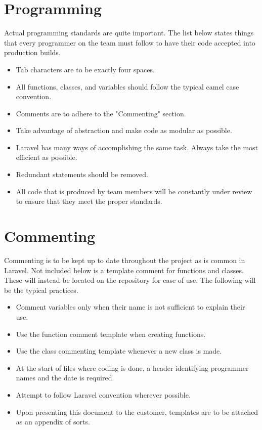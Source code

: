 \documentclass[]{article}
\begin{document}
\section{Programming}
Actual programming standards are quite important. The list below states things that every programmer on the team must follow to have their code accepted into production builds.
\begin{itemize}
	\item Tab characters are to be exactly four spaces.
	\item All functions, classes, and variables should follow the typical camel case convention.
	\item Comments are to adhere to the "Commenting" section.
	\item Take advantage of abstraction and make code as modular as possible.
	\item Laravel has many ways of accomplishing the same task. Always take the most efficient as possible.
	\item Redundant statements should be removed.
	\item All code that is produced by team members will be constantly under review to ensure that they meet the proper standards.
\end{itemize}

\section{Commenting}
Commenting is to be kept up to date throughout the project as is common in Laravel. Not included below is a template comment for functions and classes. These will instead be located on the repository for ease of use. The following will be the typical practices.
\begin{itemize}
	\item Comment variables only when their name is not sufficient to explain their use.
	\item Use the function comment template when creating functions.
	\item Use the class commenting template whenever a new class is made.
	\item At the start of files where coding is done, a header identifying programmer names and the date is required.
	\item Attempt to follow Laravel convention wherever possible.
	\item Upon presenting this document to the customer, templates are to be attached as an appendix of sorts.
\end{itemize}
\end{document}
